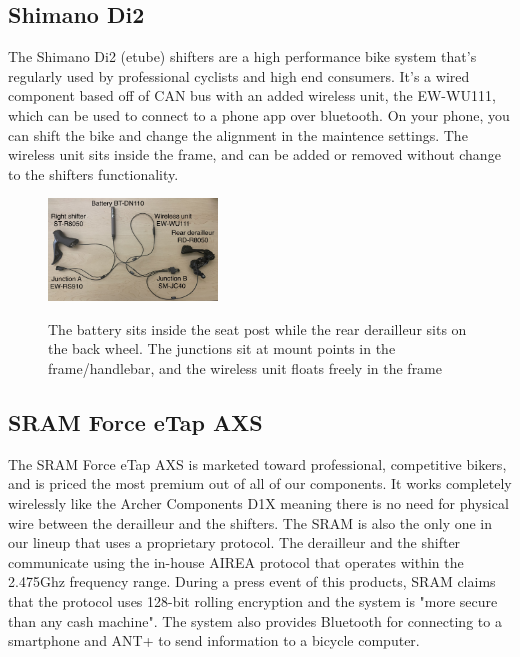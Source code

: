 \documentclass[letterpaper,twocolumn,10pt]{article}
\begin{document}
\subsection{Shimano Di2}

The Shimano Di2 (etube) shifters are a high performance bike system that's regularly used by professional cyclists and high end consumers. It's a wired component based off of CAN bus with an added wireless unit, the EW-WU111, which can be used to connect to a phone app over bluetooth. On your phone, you can shift the bike and change the alignment in the maintence settings. The wireless unit sits inside the frame, and can be added or removed without change to the shifters functionality.

\begin{figure}[ht]
  \begin{center}
    \centering
    \includegraphics[width=0.4\textwidth]{images/IMG_5264_Di2.jpg}
    \label{fig:Di2Setup}
  \end{center}
  \caption{The battery sits inside the seat post while the rear derailleur sits on the back wheel. The junctions sit at mount points in the frame/handlebar, and the wireless unit floats freely in the frame}
\end{figure}


\subsection{SRAM Force eTap AXS}
The SRAM Force eTap AXS \cite{etap} is marketed toward professional, competitive bikers, and is priced the most premium out of all of our components. It works completely wirelessly like the Archer Components D1X meaning there is no need for physical wire between the derailleur and the shifters. The SRAM is also the only one in our lineup that uses a proprietary protocol. The derailleur and the shifter communicate using the in-house AIREA protocol that operates within the 2.475Ghz frequency range. During a press event of this products, SRAM claims that  the protocol uses 128-bit rolling encryption and the system is "more secure than any cash machine".\cite{phillips2015SRAM} The system also provides Bluetooth for connecting to a smartphone and ANT+ to send information to a bicycle computer.
\end{document}
